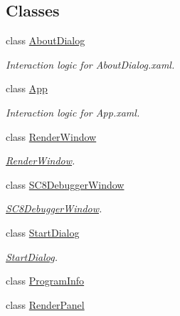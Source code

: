 \subsection*{Classes}
\begin{DoxyCompactItemize}
\item 
class \hyperlink{class_eimu_1_1_about_dialog}{AboutDialog}
\begin{DoxyCompactList}\small\item\em Interaction logic for AboutDialog.xaml. \item\end{DoxyCompactList}\item 
class \hyperlink{class_eimu_1_1_app}{App}
\begin{DoxyCompactList}\small\item\em Interaction logic for App.xaml. \item\end{DoxyCompactList}\item 
class \hyperlink{class_eimu_1_1_render_window}{RenderWindow}
\begin{DoxyCompactList}\small\item\em \hyperlink{class_eimu_1_1_render_window}{RenderWindow}. \item\end{DoxyCompactList}\item 
class \hyperlink{class_eimu_1_1_s_c8_debugger_window}{SC8DebuggerWindow}
\begin{DoxyCompactList}\small\item\em \hyperlink{class_eimu_1_1_s_c8_debugger_window}{SC8DebuggerWindow}. \item\end{DoxyCompactList}\item 
class \hyperlink{class_eimu_1_1_start_dialog}{StartDialog}
\begin{DoxyCompactList}\small\item\em \hyperlink{class_eimu_1_1_start_dialog}{StartDialog}. \item\end{DoxyCompactList}\item 
class \hyperlink{class_eimu_1_1_program_info}{ProgramInfo}
\item 
class \hyperlink{class_eimu_1_1_render_panel}{RenderPanel}
\end{DoxyCompactItemize}
